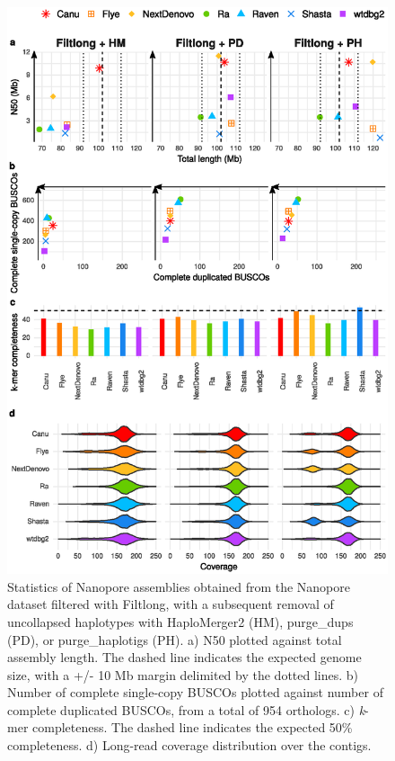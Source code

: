 \begin{suppsection}
     \begin{figure}[ht]
    \centering
     \includegraphics[width=13.5cm]{fig/benchmark/supp_nanopore_filtlong_purging_v20210310.eps}
   \caption{Statistics of Nanopore assemblies obtained from the Nanopore dataset filtered with Filtlong, with a subsequent removal of uncollapsed haplotypes with HaploMerger2 (HM), purge\_dups (PD), or purge\_haplotigs (PH). a) N50 plotted against total assembly length. The dashed line indicates the expected genome size, with a +/- 10 Mb margin delimited by the dotted lines. b) Number of complete single-copy BUSCOs plotted against number of complete duplicated BUSCOs, from a total of 954 orthologs. c) \textit{k}-mer completeness. The dashed line indicates the expected 50\% completeness. d) Long-read coverage distribution over the contigs.}
   \label{fig:nanopore_filtlong_purging}
 \end{figure}
 

\end{suppsection}
